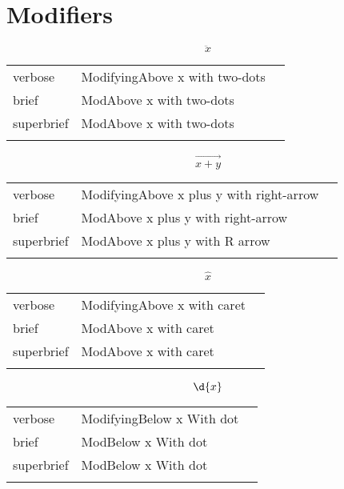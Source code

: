
\section{Modifiers}
\label{sec:modifiers}

\R
\E \[\ddot{x}\]
\begin{longtable}[c]{@{}lll@{}}
\toprule\addlinespace
verbose & ModifyingAbove x with two-dots &

\\\addlinespace
brief & ModAbove x with two-dots &

\\\addlinespace
superbrief & ModAbove x with two-dots &

\\\addlinespace
\bottomrule
\end{longtable}


\E \[\overrightarrow{x+y}\]
\begin{longtable}[c]{@{}lll@{}}
\toprule\addlinespace
verbose & ModifyingAbove x plus y with right-arrow &

\\\addlinespace
brief & ModAbove x plus y with right-arrow &

\\\addlinespace
superbrief & ModAbove x plus y with R arrow &

\\\addlinespace
\bottomrule
\end{longtable}


\E \[\hat{x}\]
\begin{longtable}[c]{@{}lll@{}}
\toprule\addlinespace
verbose & ModifyingAbove x with caret &

\\\addlinespace
brief & ModAbove x with caret &

\\\addlinespace
superbrief & ModAbove x with caret &

\\\addlinespace
\bottomrule
\end{longtable}


\R
\E \[\d{x}\]
\begin{longtable}[c]{@{}lll@{}}
\toprule\addlinespace
verbose & ModifyingBelow x With dot &

\\\addlinespace
brief & ModBelow x With dot &

\\\addlinespace
superbrief & ModBelow x With dot &

\\\addlinespace
\bottomrule
\end{longtable}


